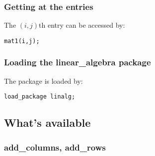 \subsubsection*{Getting at the entries}

The $(i,j)$th entry can be accessed by:

\texttt{mat1(i,j);}

\subsubsection*{Loading the linear\_algebra package}

The package is loaded by:

\texttt{load\_package linalg;}


\subsection{What's available}

\label{linalg:subsec3}

\subsubsection{add\_columns, add\_rows}
\label{linalg:add_columns}

